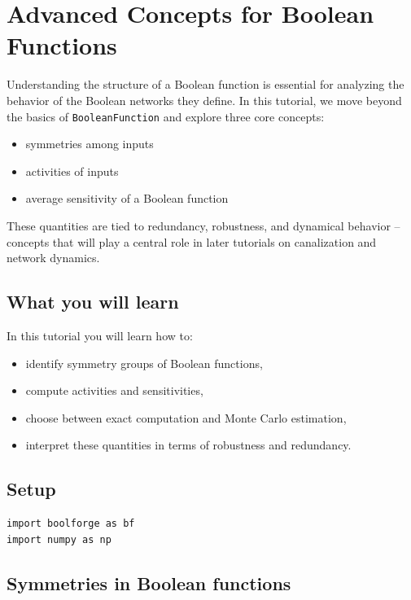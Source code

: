 \documentclass[
]{article}
\providecommand{\tightlist}{%
  \setlength{\itemsep}{0pt}\setlength{\parskip}{0pt}}
\begin{document}
\section{Advanced Concepts for Boolean
Functions}\label{advanced-concepts-for-boolean-functions}

Understanding the structure of a Boolean function is essential for
analyzing the behavior of the Boolean networks they define. In this
tutorial, we move beyond the basics of \texttt{BooleanFunction} and
explore three core concepts:

\begin{itemize}
\tightlist
\item
  symmetries among inputs
\item
  activities of inputs
\item
  average sensitivity of a Boolean function
\end{itemize}

These quantities are tied to redundancy, robustness, and dynamical
behavior -- concepts that will play a central role in later tutorials on
canalization and network dynamics.

\subsection{What you will learn}\label{what-you-will-learn-1}

In this tutorial you will learn how to:

\begin{itemize}
\tightlist
\item
  identify symmetry groups of Boolean functions,
\item
  compute activities and sensitivities,
\item
  choose between exact computation and Monte Carlo estimation,
\item
  interpret these quantities in terms of robustness and redundancy.
\end{itemize}

\subsection{Setup}\label{setup-1}

\begin{lstlisting}
import boolforge as bf
import numpy as np
\end{lstlisting}

\subsection{Symmetries in Boolean
functions}\label{symmetries-in-boolean-functions}
\end{document}

